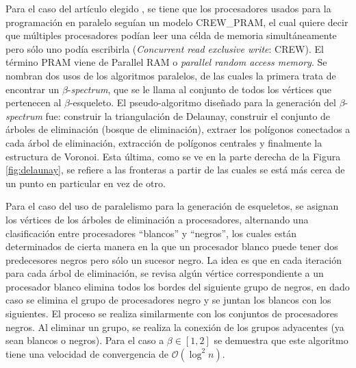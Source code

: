 \documentclass{article}
\begin{document}
Para el caso del artículo elegido \cite{beta}, se tiene que los procesadores usados para la programación en paralelo seguían un modelo CREW\_PRAM, el cual quiere decir que múltiples procesadores podían leer una célda de memoria simultáneamente pero sólo uno podía escribirla (\textit{Concurrent read exclusive write}: CREW). El término PRAM viene de Parallel RAM o \textit{parallel random access memory}. Se nombran dos usos de los algoritmos paralelos, de las cuales la primera trata de encontrar un $\beta$-\textit{spectrum}, que se le llama al conjunto de todos los vértices que pertenecen al $\beta$-esqueleto. El pseudo-algoritmo diseñado para la generación del $\beta$-\textit{spectrum} fue: construir la triangulación de Delaunay, construir el conjunto de árboles de eliminación (bosque de eliminación), extraer los polígonos conectados a cada árbol de eliminación, extracción de polígonos centrales y finalmente la estructura de Voronoi. Esta última, como se ve en la parte derecha de la Figura \ref{fig:delaunay}, se refiere a las fronteras a partir de las cuales se está más cerca de un punto en particular en vez de otro.

Para el caso del uso de paralelismo para la generación de esqueletos, se asignan los vértices de los árboles de eliminación a procesadores, alternando una clasificación entre procesadores ``blancos'' y ``negros'', los cuales están determinados de cierta manera en la que un procesador blanco puede tener dos predecesores negros pero sólo un sucesor negro. La idea es que en cada iteración para cada árbol de eliminación, se revisa algún vértice correspondiente a un procesador blanco elimina todos los bordes del siguiente grupo de negros, en dado caso se elimina el grupo de procesadores negro y se juntan los blancos con los siguientes. El proceso se realiza similarmente con los conjuntos de procesadores negros. Al eliminar un grupo, se realiza la conexión de los grupos adyacentes (ya sean blancos o negros). Para el caso a $\beta\in[1,2]$ se demuestra que este algoritmo tiene una velocidad de convergencia de $\mathcal{O}(\log^2n)$.



\end{document}
